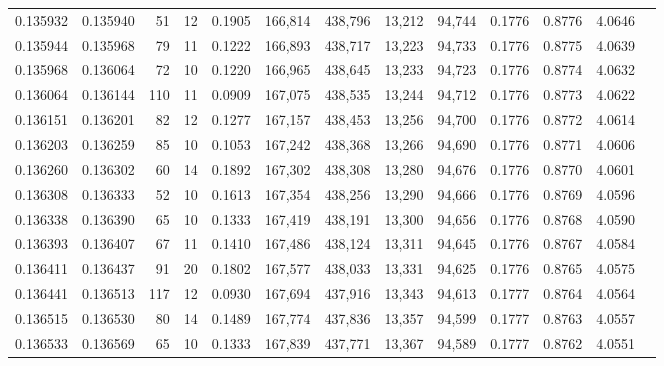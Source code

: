 \begin{tabular}{rrrrrrrrrrrrr}
0.135932 & 0.135940 &    51 &  12 &                                     0.1905 & 166,814 & 438,796 &  13,212 &  94,744 & 0.1776 & 0.8776 & 4.0646 \\
0.135944 & 0.135968 &    79 &  11 &                                     0.1222 & 166,893 & 438,717 &  13,223 &  94,733 & 0.1776 & 0.8775 & 4.0639 \\
0.135968 & 0.136064 &    72 &  10 &                                     0.1220 & 166,965 & 438,645 &  13,233 &  94,723 & 0.1776 & 0.8774 & 4.0632 \\
0.136064 & 0.136144 &   110 &  11 &                                     0.0909 & 167,075 & 438,535 &  13,244 &  94,712 & 0.1776 & 0.8773 & 4.0622 \\
0.136151 & 0.136201 &    82 &  12 &                                     0.1277 & 167,157 & 438,453 &  13,256 &  94,700 & 0.1776 & 0.8772 & 4.0614 \\
0.136203 & 0.136259 &    85 &  10 &                                     0.1053 & 167,242 & 438,368 &  13,266 &  94,690 & 0.1776 & 0.8771 & 4.0606 \\
0.136260 & 0.136302 &    60 &  14 &                                     0.1892 & 167,302 & 438,308 &  13,280 &  94,676 & 0.1776 & 0.8770 & 4.0601 \\
0.136308 & 0.136333 &    52 &  10 &                                     0.1613 & 167,354 & 438,256 &  13,290 &  94,666 & 0.1776 & 0.8769 & 4.0596 \\
0.136338 & 0.136390 &    65 &  10 &                                     0.1333 & 167,419 & 438,191 &  13,300 &  94,656 & 0.1776 & 0.8768 & 4.0590 \\
0.136393 & 0.136407 &    67 &  11 &                                     0.1410 & 167,486 & 438,124 &  13,311 &  94,645 & 0.1776 & 0.8767 & 4.0584 \\
0.136411 & 0.136437 &    91 &  20 &                                     0.1802 & 167,577 & 438,033 &  13,331 &  94,625 & 0.1776 & 0.8765 & 4.0575 \\
0.136441 & 0.136513 &   117 &  12 &                                     0.0930 & 167,694 & 437,916 &  13,343 &  94,613 & 0.1777 & 0.8764 & 4.0564 \\
0.136515 & 0.136530 &    80 &  14 &                                     0.1489 & 167,774 & 437,836 &  13,357 &  94,599 & 0.1777 & 0.8763 & 4.0557 \\
0.136533 & 0.136569 &    65 &  10 &                                     0.1333 & 167,839 & 437,771 &  13,367 &  94,589 & 0.1777 & 0.8762 & 4.0551 \\

\end{tabular}

